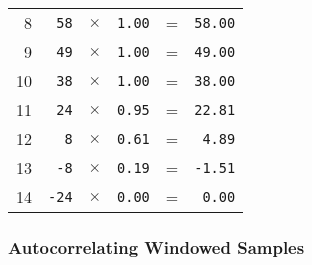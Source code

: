 {{\begin{tabular}{r|rcrcr}
8 & \texttt{58} & $\times$ & \texttt{1.00} & = & \texttt{58.00} \\
9 & \texttt{49} & $\times$ & \texttt{1.00} & = & \texttt{49.00} \\
10 & \texttt{38} & $\times$ & \texttt{1.00} & = & \texttt{38.00} \\
11 & \texttt{24} & $\times$ & \texttt{0.95} & = & \texttt{22.81} \\
12 & \texttt{8} & $\times$ & \texttt{0.61} & = & \texttt{4.89} \\
13 & \texttt{-8} & $\times$ & \texttt{0.19} & = & \texttt{-1.51} \\
14 & \texttt{-24} & $\times$ & \texttt{0.00} & = & \texttt{0.00} \\
\end{tabular}
}
}

\clearpage

\subsubsection{Autocorrelating Windowed Samples}
\EALGORITHM

